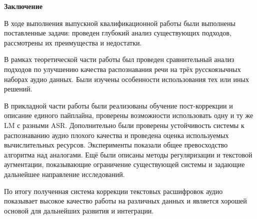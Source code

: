 \newpage
\begin{center}
  \textbf{\large Заключение}
\end{center}


В ходе выполнения выпускной квалификационной работы были выполнены поставленные задачи: проведен глубокий анализ существующих подходов, рассмотрены их преимущества и недостатки.

В рамках теоретической части работы был проведен сравнительный анализ подходов по улучшению качества распознавания речи на трёх русскоязычных наборах аудио данных.
Были изучены особенности использования тех или иных решений.

В прикладной части работы были реализованы обучение пост-коррекции и описание единого пайплайна, проверены возможности использовать одну и ту же LM с разными ASR.
Дополнительно были проверены устойчивость системы к распознаванию аудио плохого качества и проведена оценка используемых вычислительных ресурсов.
Эксперименты показали общее превосходство алгоритма над аналогами.
Ещё были описаны методы регуляризации и текстовой аугментации, показывающие ограничение существующей системы и задающие дальнейшее направление исследований.

По итогу полученная система коррекции текстовых расшифровок аудио показывает высокое качество работы на различных данных и является хорошей основой для дальнейших развития и интеграции.
